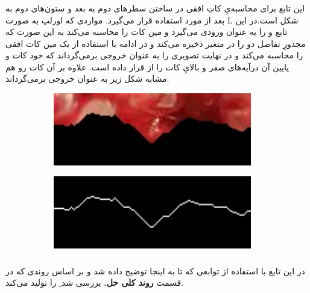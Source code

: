 \documentclass[a4paper,12pt]{article}
\begin{document}
     \subsubsection*{}
          این تابع برای محاسبه‌یِ کاتِ افقی در ساختن سطر‌های دوم به بعد و ستون‌های دوم به بعد از 
     مورد استفاده قرار می‌گیرد. مواردی که اورلپ به صورت L شکل است.در این تابع 
     و
     را به عنوان ورودی می‌گیرد و مین کات را محاسبه می‌کند به این صورت که مجذورِ تفاضل دو 
     را در متغیر 
     ذخیره می‌کند و در ادامه با استفاده از 
     یک مین کات افقی را محاسبه می‌کند و در نهایت تصویری را به عنوان خروجی بر‌می‌گرداند که خود کات و  پایین آن درآیه‌های صفر
     و بالایِ کات را از 
     قرار داده است. علاوه بر آن کات رو هم مشابه شکل زیر به عنوان خروجی برمی‌گرداند.
     \begin{figure}[H]
     	\centering
     	\begin{subfigure}{0.2\textwidth}
     		\centering
     		\includegraphics[width=0.95\textwidth]{17.jpg}
     	\end{subfigure}%
     	\begin{subfigure}{0.2\textwidth}
     		\centering
     		\includegraphics[width=0.95\textwidth]{16.jpg}
     	\end{subfigure}%
     \end{figure}
 \subsubsection*{}
 در این تابع با استفاده از توابعی که تا به اینجا توضیح داده شد و بر اساس روندی که در قسمت 
 \textbf{روند کلی حل.}
 بررسی شد 
ِ
را تولید می‌کند.
 
\end{document}
